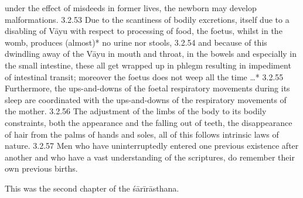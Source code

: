 \begin{translation}
  under the effect of misdeeds in former lives, the newborn may develop 
  malformations.
  3.2.53  Due to the scantiness of bodily excretions, itself due to a disabling of 
  Vāyu with respect to processing of food, the foetus, whilst in the womb, 
  produces (almost)* no urine nor stools, 
  3.2.54  and because of this dwindling away of the Vāyu in mouth and throat, in 
  the bowels and especially in the small intestine, these all get wrapped up in 
  phlegm resulting in impediment of intestinal transit; moreover the foetus does 
  not weep all the time …*
  3.2.55 Furthermore, the ups-and-downs of the foetal respiratory movements 
  during its sleep are coordinated with the ups-and-downs of the respiratory 
  movements of the mother.
  3.2.56  The adjustment of the limbs of the body to its bodily constraints, both 
  the appearance and the falling out of teeth, the disappearance of hair from the 
  palms of hands and soles, all of this follows intrinsic laws of nature.
  3.2.57  Men who have uninterruptedly entered one previous existence after 
  another and who have a vast understanding of the scriptures, do remember 
  their own previous births.
  
  This was the second chapter of the śārīrāsthana.
  
  
  
  
  
  
  
  
\end{translation}